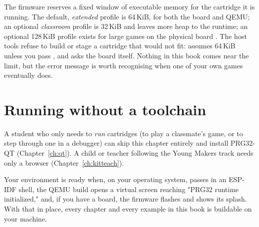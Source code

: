 The firmware reserves a fixed window of executable memory for the cartridge it
is running. The default, \emph{extended} profile is 64\,KiB, for both the board
and QEMU; an optional \emph{classroom} profile is 32\,KiB and leaves more heap
to the runtime; an optional 128\,KiB profile exists for large games on the
physical board \citep{prg32profiles}. The host tools refuse to build or stage a
cartridge that would not fit:  assumes 64\,KiB unless you
pass , and  asks the board itself.
Nothing in this book comes near the limit, but the error message is worth
recognising when one of your own games eventually does.

\section{Running without a toolchain}

A student who only needs to \emph{run} cartridges (to play a classmate's game,
or to step through one in a debugger) can skip this chapter entirely and install
PRG32-QT (Chapter~\ref{ch:qt}). A child or teacher following the Young Makers
track needs only a browser (Chapter~\ref{ch:kitteach}).

\begin{prgcheck}
Your environment is ready when, on your operating system,  passes in an ESP-IDF shell, the QEMU build opens a virtual screen reaching "PRG32 runtime
initialized," and, if you have a board, the firmware flashes and shows its
splash. With that in place, every chapter and every example in this book is
buildable on your machine.
\end{prgcheck}
